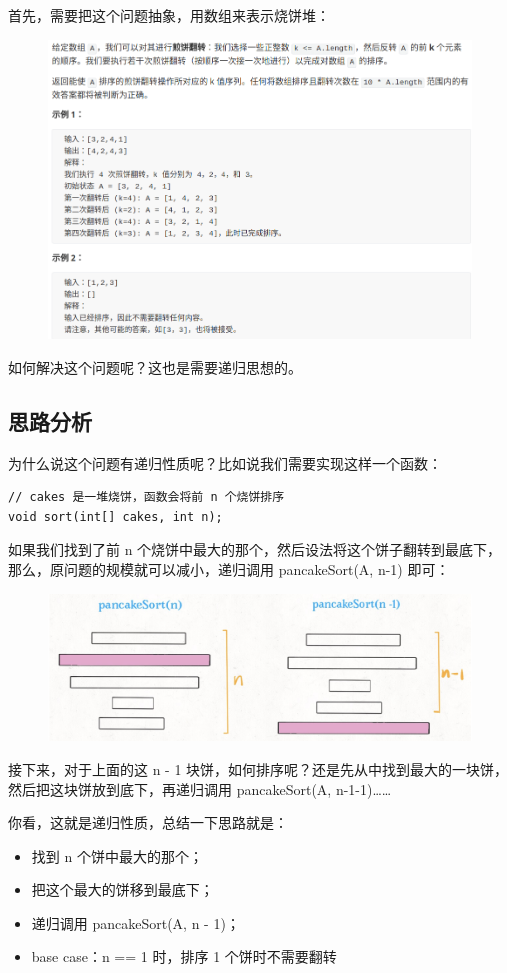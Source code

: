 \documentclass[12pt]{article}
\begin{document}
首先，需要把这个问题抽象，用数组来表示烧饼堆：
\begin{figure}[H]
    \centering
    \includegraphics[width=1\textwidth]{fig/Pancake_Sorting_2.png}
\end{figure}
如何解决这个问题呢？这也是需要递归思想的。

\subsection{思路分析}
为什么说这个问题有递归性质呢？比如说我们需要实现这样一个函数：
\begin{lstlisting}
// cakes 是一堆烧饼，函数会将前 n 个烧饼排序
void sort(int[] cakes, int n);
\end{lstlisting}

如果我们找到了前 n 个烧饼中最大的那个，然后设法将这个饼子翻转到最底下，那么，原问题的规模就可以减小，递归调用 pancakeSort(A, n-1) 即可：
\begin{figure}[H]
    \centering
    \includegraphics[width=.5\textwidth]{fig/Pancake_Sorting_3.png}
\end{figure}

接下来，对于上面的这 n - 1 块饼，如何排序呢？还是先从中找到最大的一块饼，然后把这块饼放到底下，再递归调用 pancakeSort(A, n-1-1)……

你看，这就是递归性质，总结一下思路就是：
\begin{itemize}
\setlength{\itemsep}{0pt}
\setlength{\parsep}{0pt}
\setlength{\parskip}{0pt}
    \item 找到 n 个饼中最大的那个；
    \item 把这个最大的饼移到最底下；
    \item 递归调用 pancakeSort(A, n - 1)；
    \item base case：n == 1 时，排序 1 个饼时不需要翻转
\end{itemize}
\end{document}
